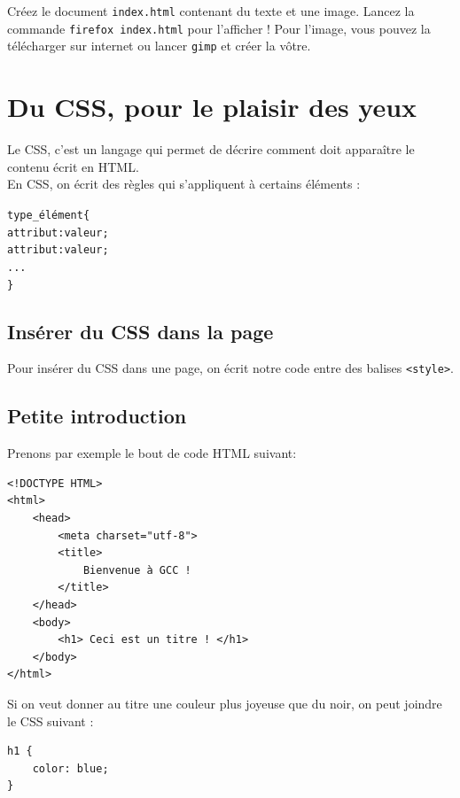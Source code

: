 \begin{exercise}
  Créez le document \texttt{index.html} contenant du texte et une image.
  Lancez la commande \texttt{firefox index.html} pour l'afficher ! Pour l'image,
  vous pouvez la télécharger sur internet ou lancer \texttt{gimp} et créer la
  vôtre.
\end{exercise}

\section{Du CSS, pour le plaisir des yeux}

Le CSS, c'est un langage qui permet de décrire comment doit apparaître le
contenu écrit en HTML.\\

En CSS, on écrit des règles qui s'appliquent à certains éléments :

\begin{alltt}
\colorbox{blue!30}{type_élément} \{
        \colorbox{green!30}{attribut}: \colorbox{red!30}{valeur};
        \colorbox{green!30}{attribut}: \colorbox{red!30}{valeur};
        ...
\}
\end{alltt}

\subsection{Insérer du CSS dans la page}

Pour insérer du CSS dans une page, on écrit notre code entre des balises
\texttt{<style>}.

\subsection{Petite introduction}
Prenons par exemple le bout de code HTML suivant:

\begin{verbatim}
<!DOCTYPE HTML>
<html>
    <head>
        <meta charset="utf-8">
        <title>
            Bienvenue à GCC !
        </title>
    </head>
    <body>
        <h1> Ceci est un titre ! </h1>
    </body>
</html>
\end{verbatim}

Si on veut donner au titre une couleur plus joyeuse que du noir, on peut
joindre le CSS suivant :

\begin{verbatim}
h1 {
    color: blue;
}
\end{verbatim}

